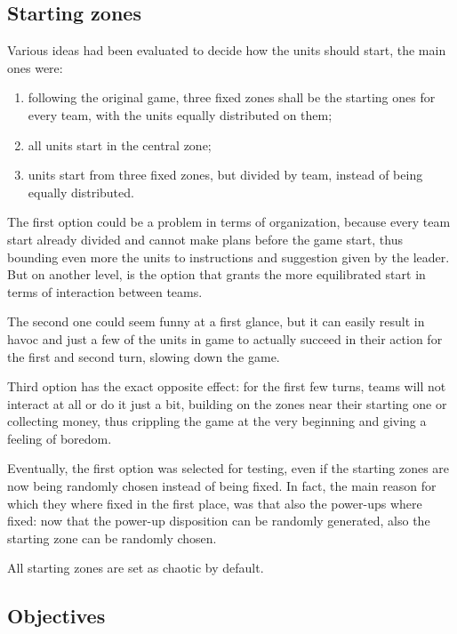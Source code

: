 		\subsection{Starting zones}
			
			Various ideas had been evaluated to decide how the units should start, the main ones were: 
			
			\begin{enumerate}
				\item following the original game, three fixed zones shall be the starting ones for every team, with the units equally distributed on them;
				\item all units start in the central zone;
				\item units start from three fixed zones, but divided by team, instead of being equally distributed.
			\end{enumerate}
			
			The first option could be a problem in terms of organization, because every team start already divided and cannot make plans before the game start, thus bounding even more the units to instructions and suggestion given by the leader.
			But on another level, is the option that grants the more equilibrated start in terms of interaction between teams.
			
			The second one could seem funny at a first glance, but it can easily result in havoc and just a few of the units in game to actually succeed in their action for the first and second turn, slowing down the game.
			
			Third option has the exact opposite effect: for the first few turns, teams will not interact at all or do it just a bit, building on the zones near their starting one or collecting money, thus crippling the game at the very beginning and giving a feeling of boredom. 
			
			Eventually, the first option was selected for testing, even if the starting zones are now being randomly chosen instead of being fixed.
			In fact, the main reason for which they where fixed in the first place, was that also the power-ups where fixed: now that the power-up disposition can be randomly generated, also the starting zone can be randomly chosen.
			
			All starting zones are set as chaotic by default.
		
		\subsection{Objectives}
			
